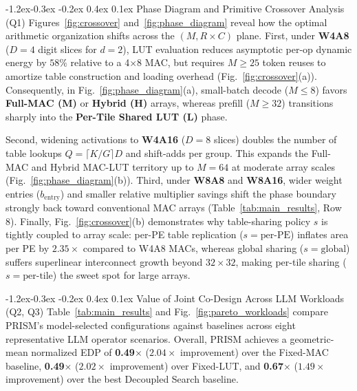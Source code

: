 \documentclass[10pt,letterpaper,twocolumn]{article}
\makeatletter
\renewcommand\subsection{\@startsection{subsection}{2}{\z@}%
  {-1.2ex\@plus -0.3ex \@minus -0.2ex}%
  {0.4ex \@plus 0.1ex}%
  {\normalfont\normalsize\bfseries}}
\makeatother
\begin{document}
\subsection{Phase Diagram and Primitive Crossover Analysis (Q1)}
Figures~\ref{fig:crossover} and~\ref{fig:phase_diagram} reveal how the optimal arithmetic organization shifts across the $(M, R\times C)$ plane. First, under \textbf{W4A8} ($D=4$ digit slices for $d=2$), LUT evaluation reduces asymptotic per-op dynamic energy by $58\%$ relative to a 4$\times$8 MAC, but requires $M \ge 25$ token reuses to amortize table construction and loading overhead (Fig.~\ref{fig:crossover}(a)). Consequently, in Fig.~\ref{fig:phase_diagram}(a), small-batch decode ($M \le 8$) favors \textbf{Full-MAC (M)} or \textbf{Hybrid (H)} arrays, whereas prefill ($M \ge 32$) transitions sharply into the \textbf{Per-Tile Shared LUT (L)} phase.

Second, widening activations to \textbf{W4A16} ($D=8$ slices) doubles the number of table lookups $Q = \lceil K/G \rceil D$ and shift-adds per group. This expands the Full-MAC and Hybrid MAC-LUT territory up to $M = 64$ at moderate array scales (Fig.~\ref{fig:phase_diagram}(b)). Third, under \textbf{W8A8} and \textbf{W8A16}, wider weight entries ($b_{\text{entry}}$) and smaller relative multiplier savings shift the phase boundary strongly back toward conventional MAC arrays (Table~\ref{tab:main_results}, Row 8). Finally, Fig.~\ref{fig:crossover}(b) demonstrates why table-sharing policy $s$ is tightly coupled to array scale: per-PE table replication ($s=\text{per-PE}$) inflates area per PE by $2.35\times$ compared to W4A8 MACs, whereas global sharing ($s=\text{global}$) suffers superlinear interconnect growth beyond $32 \times 32$, making per-tile sharing ($s=\text{per-tile}$) the sweet spot for large arrays.

\subsection{Value of Joint Co-Design Across LLM Workloads (Q2, Q3)}
Table~\ref{tab:main_results} and Fig.~\ref{fig:pareto_workloads} compare PRISM's model-selected configurations against baselines across eight representative LLM operator scenarios. Overall, PRISM achieves a geometric-mean normalized EDP of \textbf{0.49$\times$} ($2.04\times$ improvement) over the Fixed-MAC baseline, \textbf{0.49$\times$} ($2.02\times$ improvement) over Fixed-LUT, and \textbf{0.67$\times$} ($1.49\times$ improvement) over the best Decoupled Search baseline.
\end{document}
